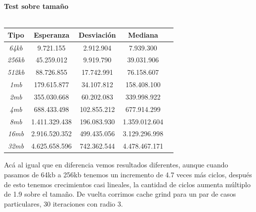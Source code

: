 \documentclass[a4paper]{article}
\begin{document}
\newpage
\begin{center}
          \textbf{Test sobre tamaño}  \\ 
          \hfill \\
        \begin{tabular}[c]{|c|c|c|c|c|}
        \hline
      \textbf{Tipo}  & \textbf{Esperanza} & \textbf{Desviación} & \textbf{Mediana}\\
          	\hline
\textit{64kb} &	9.721.155 & 2.912.904 & 7.939.300 \\
		\hline

\textit{256kb} &	45.259.012 & 9.919.790 & 39.031.906 \\
		\hline
\textit{512kb} &	88.726.855 & 17.742.991 & 76.158.607 \\
		\hline
\textit{1mb} &	179.615.877 & 34.107.812 & 158.408.100  \\
		\hline
\textit{2mb} &	355.030.668 & 60.202.083 & 339.998.922  \\
		\hline
\textit{4mb} &	688.433.498 & 102.855.212 & 677.914.299  \\
		\hline
\textit{8mb} &	1.411.329.438 & 196.083.930 & 1.359.012.604  \\
		\hline
\textit{16mb} & 2.916.520.352 & 499.435.056 & 3.129.296.998  \\
		\hline
\textit{32mb} & 4.625.658.596 & 742.362.544 & 4.478.467.171  \\
		\hline

	\end{tabular}
\end{center}

Acá al igual que en diferencia vemos resultados diferentes, aunque cuando pasamos de 64kb a 256kb tenemos un incremento de 4.7 veces más ciclos, después de esto tenemos crecimientos casi lineales, la cantidad de ciclos aumenta múltiplo de 1.9  sobre el tamaño. De vuelta corrimos cache grind para un par de casos particulares, 30 iteraciones con radio 3. 
\end{document}

